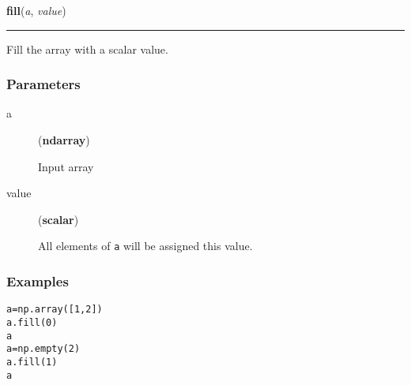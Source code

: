     \begin{boxedminipage}{\textwidth}

    \raggedright \textbf{fill}(\textit{a}, \textit{value})

    \vspace{-1.5ex}

    \rule{\textwidth}{0.5\fboxrule}

Fill the array with a scalar value.



\hypertarget{parameters}{}
\subsubsection*{Parameters}
\begin{description}
\item[{a}] (\textbf{ndarray})

Input array

\item[{value}] (\textbf{scalar})

All elements of \texttt{a} will be assigned this value.

\end{description}



\hypertarget{examples}{}
\subsubsection*{Examples}
\begin{alltt}
\pysrcprompt{{\textgreater}{\textgreater}{\textgreater} }a = np.array([1, 2])
\pysrcprompt{{\textgreater}{\textgreater}{\textgreater} }a.fill(0)
\pysrcprompt{{\textgreater}{\textgreater}{\textgreater} }a
\pysrcoutput{}\pysrcprompt{{\textgreater}{\textgreater}{\textgreater} }a = np.empty(2)
\pysrcprompt{{\textgreater}{\textgreater}{\textgreater} }a.fill(1)
\pysrcprompt{{\textgreater}{\textgreater}{\textgreater} }a
\end{alltt}
    \vspace{1ex}

    \end{boxedminipage}

